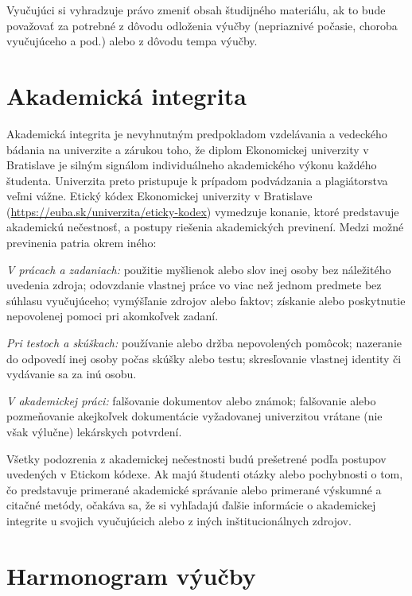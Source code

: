 \documentclass[11pt]{article}
\begin{document}
\smallskip
\noindent\footnotesize Vyučujúci si vyhradzuje právo zmeniť obsah študijného materiálu, ak to bude
považovať za potrebné z dôvodu odloženia výučby (nepriaznivé počasie, choroba vyučujúceho a pod.) alebo z
dôvodu tempa výučby.\normalsize

\section{Akademická integrita}

Akademická integrita je nevyhnutným predpokladom vzdelávania a vedeckého bádania na univerzite a zárukou
toho, že diplom Ekonomickej univerzity v Bratislave je silným signálom individuálneho akademického výkonu
každého študenta. Univerzita preto pristupuje k prípadom podvádzania a plagiátorstva veľmi vážne. Etický
kódex Ekonomickej univerzity v Bratislave (\url{https://euba.sk/univerzita/eticky-kodex}) vymedzuje
konanie, ktoré predstavuje akademickú nečestnosť, a postupy riešenia akademických previnení. Medzi možné
previnenia patria okrem iného:

\smallskip
\noindent\textit{V prácach a zadaniach:} použitie myšlienok alebo slov inej osoby bez náležitého uvedenia
zdroja; odovzdanie vlastnej práce vo viac než jednom predmete bez súhlasu vyučujúceho; vymýšľanie zdrojov
alebo faktov; získanie alebo poskytnutie nepovolenej pomoci pri akomkoľvek zadaní.

\noindent\textit{Pri testoch a skúškach:} používanie alebo držba nepovolených pomôcok; nazeranie do
odpovedí inej osoby počas skúšky alebo testu; skresľovanie vlastnej identity či vydávanie sa za inú osobu.

\noindent\textit{V akademickej práci:} falšovanie dokumentov alebo známok; falšovanie alebo pozmeňovanie
akejkoľvek dokumentácie vyžadovanej univerzitou vrátane (nie však výlučne) lekárskych potvrdení.

\smallskip
Všetky podozrenia z akademickej nečestnosti budú prešetrené podľa postupov uvedených v Etickom kódexe. Ak
majú študenti otázky alebo pochybnosti o tom, čo predstavuje primerané akademické správanie alebo primerané
výskumné a citačné metódy, očakáva sa, že si vyhľadajú ďalšie informácie o akademickej integrite u svojich
vyučujúcich alebo z iných inštitucionálnych zdrojov.

\clearpage

\section{Harmonogram výučby}
\end{document}
